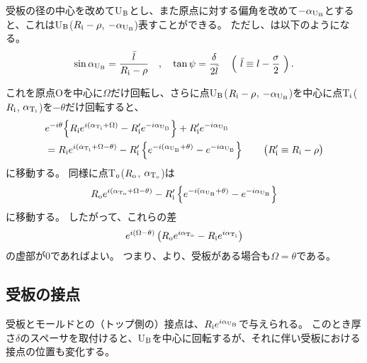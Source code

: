受板の径の中心を改めてU$_\text B$とし、また原点に対する偏角を改めて$-\alpha_{\text U_\text B}$とすると、これはU$_\text B$($R_\text i-\rho$, $-\alpha_{\text U_\text B}$)表すことができる。
ただし、は以下のようになる。
\begin{align*}
  \sin\alpha_{\text U_\text B} = \frac{\bar l}{R_\text i-\rho}\quad, \quad
  \tan\psi = \frac\delta{2\bar l} \quad
  \left(~\bar l \equiv l-\frac\sigma2~\right).
\end{align*}

これを原点Oを中心に$\Omega$だけ回転し、さらに点U$_\text B$($R_\text i-\rho$, $-\alpha_{\text U_\text B}$)を中心に点T$_\text i$($R_\text i$, $\alpha_{\text T_\text i}$)を$-\theta$だけ回転すると、
\begin{align}
  \notag
  & e^{-i\theta}\!\left\{R_\text ie^{i(\alpha_{\text T_\text i} + \Omega)} - R_\text i'e^{-i\alpha_{\text U_\text B}}\right\}
    +R_\text i'e^{-i\alpha_{\text U_\text B}}\\
  & = R_\text ie^{i(\alpha_{\text T_\text i}+\Omega-\theta)}
      -R_\text i'\left\{e^{-i(\alpha_{\text U_\text B}+\theta)}-e^{-i\alpha_{\text U_\text B}}\right\}\qquad
    \big(R_\text i' \equiv R_\text i-\rho\big)
    \label{eq:afterftUfinite}
\end{align}
に移動する。
同様に点T$_\text o$($R_\text o$, $\alpha_{\text T_\text o}$)は
\begin{align*}
  R_\text oe^{i(\alpha_{\text T_\text o} + \Omega - \theta)} - R_\text i'\left\{e^{-i(\alpha_{\text U_\text B} + \theta)} - e^{-i\alpha_{\text U_\text B}}\right\}
\end{align*}
に移動する。
したがって、これらの差
\begin{align*}
  e^{i(\Omega - \theta)}\left(R_\text oe^{i\alpha_{\text T_\text o}} - R_\text ie^{i\alpha_{\text T_\text i}}\right)
\end{align*}
の虚部が$0$であればよい。
つまり、より、受板がある場合も$\Omega = \theta$である。



\subsection{受板の接点}
受板とモールドとの（トップ側の）接点は、$R_\text ie^{i\alpha_{\text U_\text B}}$で与えられる。
このとき厚さ$\delta$のスペーサを取付けると、U$_\text B$を中心に回転するが、それに伴い受板における接点の位置も変化する。



